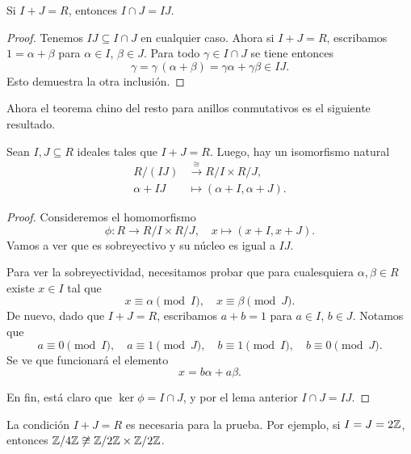 \begin{lema}
  Si $I + J = R$, entonces $I \cap J = IJ$.

  \begin{proof}
    Tenemos $IJ \subseteq I\cap J$ en cualquier caso. Ahora si $I + J = R$,
    escribamos $1 = \alpha + \beta$ para $\alpha \in I$, $\beta \in J$.
    Para todo $\gamma \in I \cap J$ se tiene entonces
    $$\gamma = \gamma\,(\alpha + \beta) = \gamma \alpha + \gamma \beta \in IJ.$$
    Esto demuestra la otra inclusión.
  \end{proof}
\end{lema}

Ahora el teorema chino del resto para anillos conmutativos es el siguiente
resultado.

\begin{teorema}
  Sean $I, J \subseteq R$ ideales tales que $I + J = R$. Luego, hay un
  isomorfismo natural
  \begin{align*}
    R/(IJ) & \xrightarrow{\cong} R/I \times R/J,\\
    \alpha + IJ & \mapsto (\alpha + I, \alpha + J).
  \end{align*}

  \begin{proof}
    Consideremos el homomorfismo
    \[ \phi\colon R \to R/I \times R/J, \quad
       x \mapsto (x+I,x+J). \]
    Vamos a ver que es sobreyectivo y su núcleo es igual a $IJ$.

    Para ver la sobreyectividad, necesitamos probar que para cualesquiera
    $\alpha,\beta\in R$ existe $x\in I$ tal que
    $$x \equiv \alpha \pmod{I}, \quad x \equiv \beta \pmod{J}.$$
    De nuevo, dado que $I + J = R$, escribamos $a + b = 1$ para $a \in I$, $b
    \in J$. Notamos que
    \[ a \equiv 0 \pmod{I}, \quad
       a \equiv 1 \pmod{J}, \quad
       b \equiv 1 \pmod{I}, \quad
       b \equiv 0 \pmod{J}. \]
    Se ve que funcionará el elemento
    $$x = b \alpha + a \beta.$$

    En fin, está claro que $\ker \phi = I \cap J$, y por el lema anterior
    $I \cap J = IJ$.
  \end{proof}
\end{teorema}

\begin{comentario}
  La condición $I + J = R$ es necesaria para la prueba. Por ejemplo, si
  $I = J = 2\mathbb{Z}$, entonces $\mathbb{Z}/4\mathbb{Z} \not\cong \mathbb{Z}/2\mathbb{Z} \times \mathbb{Z}/2\mathbb{Z}$.
\end{comentario}


